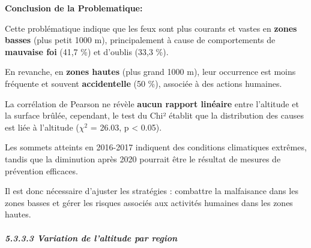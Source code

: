 \documentclass[
]{article}
\begin{document}
\textbf{Conclusion de la Problematique:}

Cette problématique indique que les feux sont plus courants et vastes en
\textbf{zones basses} (plus petit 1000 m), principalement à cause de
comportements de \textbf{mauvaise foi} (41,7 \%) et d'oublis (33,3 \%).

En revanche, en \textbf{zones hautes} (plus grand 1000 m), leur
occurrence est moins fréquente et souvent \textbf{accidentelle} (50 \%),
associée à des actions humaines.

La corrélation de Pearson ne révèle \textbf{aucun rapport linéaire}
entre l'altitude et la surface brûlée, cependant, le test du Chi²
établit que la distribution des causes est liée à l'altitude (\(\chi^2\)
= 26.03, p \textless{} 0.05).

Les sommets atteints en 2016-2017 indiquent des conditions climatiques
extrêmes, tandis que la diminution après 2020 pourrait être le résultat
de mesures de prévention efficaces.

Il est donc nécessaire d'ajuster les stratégies : combattre la
malfaisance dans les zones basses et gérer les risques associés aux
activités humaines dans les zones hautes.

\subparagraph{5.3.3.3 Variation de l'altitude par
region}\label{variation-de-laltitude-par-region}
\end{document}
